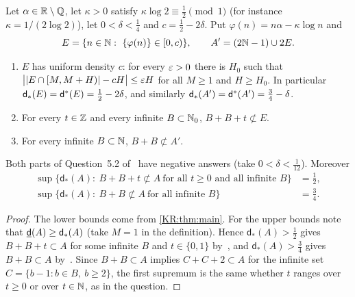 \begin{theorem}\label{KR:thm:main}
Let $\alpha\in\mathbb{R}\setminus\mathbb{Q}$, let $\kappa>0$ satisfy $\kappa\log2\equiv\frac12\pmod1$ (for instance
$\kappa=1/(2\log 2)$), let $0<\delta<\frac14$ and $c=\frac12-2\delta$. Put $\varphi(n)=n\alpha-\kappa\log n$
and
\[
E=\{n\in\N:\ \{\varphi(n)\}\in[0,c)\},\qquad A'=(2\N-1)\cup2E .
\]
\begin{enumerate}[label=\textup{(\alph*)}]
\item\label{KR:it:dens} $E$ has uniform density $c$: for every $\varepsilon>0$ there is $H_0$ such that
$\big||E\cap[M,M+H)|-cH\big|\le\varepsilon H$ for all $M\ge1$ and $H\ge H_0$. In particular
$\mathsf d_*(E)=\mathsf{d}^*(E)=\frac12-2\delta$, and similarly $\mathsf d_*(A')=\mathsf{d}^*(A')=\frac34-\delta$.
\item\label{KR:it:E} For every $t\in\mathbb{Z}$ and every infinite $B\subset\mathbb{N}_0$, $B+B+t\not\subset E$.
\item\label{KR:it:A} For every infinite $B\subset\mathbb{N}$, $B+B\not\subset A'$.
\end{enumerate}
\end{theorem}

\begin{corollary}\label{KR:cor:main}
Both parts of Question~5.2 of~\cite{kousek2024infinite} have negative answers (take
$0<\delta<\frac1{12}$). Moreover
\begin{align*}
\sup\{\mathsf d_*(A):\ B+B+t\not\subset A\ \text{for all } t\ge0 \text{ and all infinite } B\}&=\tfrac12,\\
\sup\{\mathsf d_*(A):\ B+B\not\subset A\ \text{for all infinite } B\}&=\tfrac34 .
\end{align*}
\end{corollary}

\begin{proof}
The lower bounds come from \cref{KR:thm:main}. For the upper bounds note that
$\underline{\mathsf{d}}(A)\ge\mathsf d_*(A)$ (take $M=1$ in the definition). Hence $\mathsf d_*(A)>\frac12$ gives
$B+B+t\subset A$ for some infinite $B$ and $t\in\{0,1\}$ by~\cite[Theorem~1.3]{kousek2024infinite},
and $\mathsf d_*(A)>\frac34$ gives $B+B\subset A$ by~\cite[Theorem~1.2]{kousek2024infinite}.
Since $B+B\subset A$ implies $C+C+2\subset A$ for the infinite set $C=\{b-1:b\in B,\ b\ge2\}$, the
first supremum is the same whether $t$ ranges over $t\ge0$ or over $t\in\mathbb{N}$, as in the question.
\end{proof}

